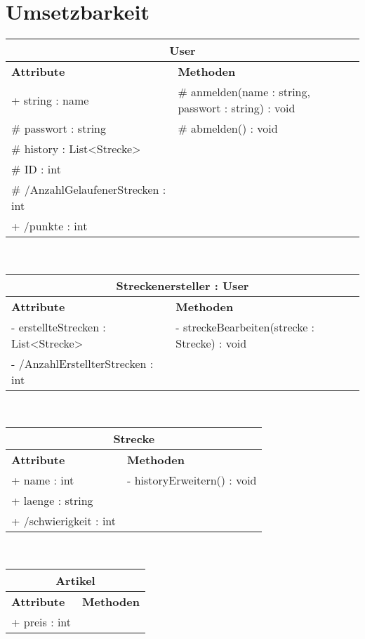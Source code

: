 \documentclass[a4paper, 12pt]{article}
\begin{document}
\section{Umsetzbarkeit}
\begin{tabular}{ | p{5.5cm} | p{8cm} |}
\multicolumn{2}{c}{\textbf{User}}\\ \hline
\textbf{Attribute} & \textbf{Methoden} \\ \hline
+ string : name & \# anmelden(name : string, passwort : string) : void \\ \hline
\# passwort : string & \# abmelden() : void  \\ \hline
\# history : List<Strecke> &  \\ \hline
\# ID : int &  \\ \hline
\# /AnzahlGelaufenerStrecken : int &  \\ \hline
+ /punkte : int & \\ \hline
\end{tabular}\\[1\baselineskip]

\begin{tabular}{ | p{5.5cm} | p{8cm} |}
\multicolumn{2}{c}{\textbf{Streckenersteller : User}}\\ \hline
\textbf{Attribute} & \textbf{Methoden} \\ \hline
- erstellteStrecken : List<Strecke> & - streckeBearbeiten(strecke : Strecke) : void  \\ \hline
- /AnzahlErstellterStrecken : int & \\ \hline
\end{tabular}\\[1\baselineskip]

\begin{tabular}{ | p{5.5cm} | p{8cm} |}
\multicolumn{2}{c}{\textbf{Strecke}}\\ \hline
\textbf{Attribute} & \textbf{Methoden} \\ \hline
+ name : int & - historyErweitern() : void \\ \hline
+ laenge : string &  \\ \hline
+ /schwierigkeit : int &  \\ \hline
\end{tabular}\\[1\baselineskip]

\begin{tabular}{ | p{5.5cm} | p{8cm} |}
\multicolumn{2}{c}{\textbf{Artikel}}\\ \hline
\textbf{Attribute} & \textbf{Methoden} \\ \hline
+ preis : int &  \\ \hline
\end{tabular}\\[1\baselineskip]
\end{document}
